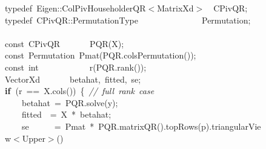 \documentclass[shortnames,article,nojss]{jss}
\newcommand{\hlstd}[1]{\textcolor[rgb]{0,0,0}{#1}}
\newcommand{\hlopt}[1]{\textcolor[rgb]{0,0,0}{#1}}
\newcommand{\hlslc}[1]{\textcolor[rgb]{0.67,0.13,0.13}{\it{#1}}}
\newcommand{\hlkwa}[1]{\textcolor[rgb]{0.61,0.13,0.93}{\bf{#1}}}
\newcommand{\hlkwb}[1]{\textcolor[rgb]{0.13,0.54,0.13}{#1}}
\newcommand{\hlkwc}[1]{\textcolor[rgb]{0,0,1}{#1}}
\newcommand{\hlkwd}[1]{\textcolor[rgb]{0,0,0}{#1}}
\begin{document}
\begin{figure}[htb]
    \noindent
    \ttfamily
    \hlstd{}\hlkwc{typedef\ }\hlstd{Eigen}\hlopt{::}\hlstd{ColPivHouseholderQR}\hlopt{$<$}\hlstd{MatrixXd}\hlopt{$>$}\hlstd{\ \ }\hlopt{}\hlstd{CPivQR}\hlopt{;}\hspace*{\fill}\\
    \hlstd{}\hlkwc{typedef\ }\hlstd{CPivQR}\hlopt{::}\hlstd{PermutationType}\hlstd{\ \ \ \ \ \ \ \ \ \ \ \ \ \ \ }\hlstd{Permutation}\hlopt{;}\hspace*{\fill}\\
    \hlstd{}\hspace*{\fill}\\
    \hlkwb{const\ }\hlstd{CPivQR}\hlstd{\ \ \ \ \ \ \ }\hlstd{}\hlkwd{PQR}\hlstd{}\hlopt{(}\hlstd{X}\hlopt{);}\hspace*{\fill}\\
    \hlstd{}\hlkwb{const\ }\hlstd{Permutation\ }\hlkwd{Pmat}\hlstd{}\hlopt{(}\hlstd{PQR}\hlopt{.}\hlstd{}\hlkwd{colsPermutation}\hlstd{}\hlopt{());}\hspace*{\fill}\\
    \hlstd{}\hlkwb{const\ int}\hlstd{\ \ \ \ \ \ \ \ \ \ \ \ }\hlkwb{}\hlstd{}\hlkwd{r}\hlstd{}\hlopt{(}\hlstd{PQR}\hlopt{.}\hlstd{}\hlkwd{rank}\hlstd{}\hlopt{());}\hspace*{\fill}\\
    \hlstd{VectorXd}\hlstd{\ \ \ \ \ \ \ }\hlstd{betahat}\hlopt{,\ }\hlstd{fitted}\hlopt{,\ }\hlstd{se}\hlopt{;}\hspace*{\fill}\\
    \hlstd{}\hlkwa{if\ }\hlstd{}\hlopt{(}\hlstd{r\ }\hlopt{==\ }\hlstd{X}\hlopt{.}\hlstd{}\hlkwd{cols}\hlstd{}\hlopt{())\ \{\ }\hlstd{}\hlslc{//\ full\ rank\ case}\hspace*{\fill}\\
    \hlstd{}\hlstd{\ \ \ \ }\hlstd{betahat\ }\hlopt{=\ }\hlstd{PQR}\hlopt{.}\hlstd{}\hlkwd{solve}\hlstd{}\hlopt{(}\hlstd{y}\hlopt{);}\hspace*{\fill}\\
    \hlstd{}\hlstd{\ \ \ \ }\hlstd{fitted}\hlstd{\ \ }\hlstd{}\hlopt{=\ }\hlstd{X\ }\hlopt{{*}\ }\hlstd{betahat}\hlopt{;}\hspace*{\fill}\\
    \hlstd{}\hlstd{\ \ \ \ }\hlstd{se}\hlstd{\ \ \ \ \ \ }\hlstd{}\hlopt{=\ }\hlstd{Pmat\ }\hlopt{{*}\ }\hlstd{PQR}\hlopt{.}\hlstd{}\hlkwd{matrixQR}\hlstd{}\hlopt{().}\hlstd{}\hlkwd{topRows}\hlstd{}\hlopt{(}\hlstd{p}\hlopt{).}\hlstd{triangularView}\hlopt{$<$}\hlstd{Upper}\hlopt{$>$()}\hspace*{\fill}\\

\end{figure}
\end{document}
